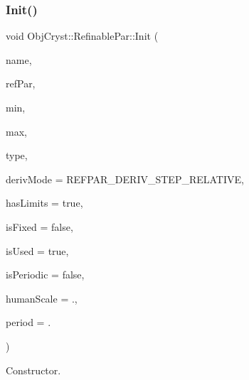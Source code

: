 \subsubsection{\texorpdfstring{Init()}{Init()}}
{\footnotesize\ttfamily void Obj\+Cryst\+::\+Refinable\+Par\+::\+Init (\begin{DoxyParamCaption}\item[{const string \&}]{name,  }\item[{R\+E\+AL $\ast$}]{ref\+Par,  }\item[{const R\+E\+AL}]{min,  }\item[{const R\+E\+AL}]{max,  }\item[{const \mbox{\hyperlink{class_obj_cryst_1_1_ref_par_type}{Ref\+Par\+Type}} $\ast$}]{type,  }\item[{Ref\+Par\+Deriv\+Step\+Model}]{deriv\+Mode = {\ttfamily REFPAR\+\_\+DERIV\+\_\+STEP\+\_\+RELATIVE},  }\item[{const bool}]{has\+Limits = {\ttfamily true},  }\item[{const bool}]{is\+Fixed = {\ttfamily false},  }\item[{const bool}]{is\+Used = {\ttfamily true},  }\item[{const bool}]{is\+Periodic = {\ttfamily false},  }\item[{const R\+E\+AL}]{human\+Scale = {.},  }\item[{R\+E\+AL}]{period = {.} }\end{DoxyParamCaption})}



Constructor. 

